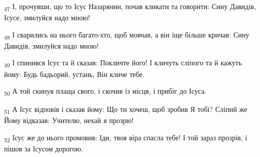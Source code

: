 \begin{tcolorbox}
\textsubscript{47} І, прочувши, що то Ісус Назарянин, почав кликати та говорити: Сину Давидів, Ісусе, змилуйся надо мною!
\end{tcolorbox}
\begin{tcolorbox}
\textsubscript{48} І сварились на нього багато-хто, щоб мовчав, а він іще більше кричав: Сину Давидів, змилуйся надо мною!
\end{tcolorbox}
\begin{tcolorbox}
\textsubscript{49} І спинився Ісус та й сказав: Покличте його! І кличуть сліпого та й кажуть йому: Будь бадьорий, устань, Він кличе тебе.
\end{tcolorbox}
\begin{tcolorbox}
\textsubscript{50} А той скинув плаща свого, і скочив із місця, і прибіг до Ісуса.
\end{tcolorbox}
\begin{tcolorbox}
\textsubscript{51} А Ісус відповів і сказав йому: Що ти хочеш, щоб зробив Я тобі? Сліпий же Йому відказав: Учителю, нехай я прозрю!
\end{tcolorbox}
\begin{tcolorbox}
\textsubscript{52} Ісус же до нього промовив: Іди, твоя віра спасла тебе! І той зараз прозрів, і пішов за Ісусом дорогою.
\end{tcolorbox}
